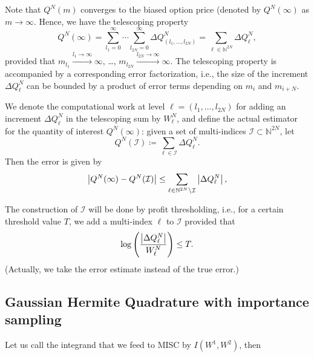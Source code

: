 \documentclass[11pt]{article}
\begin{document}
Note that $Q^N(m)$ converges to the biased option price (denoted by $Q^N(\infty)$ as
$m \to \infty$. Hence, we have the telescoping property
\begin{equation}
Q^N(\infty) = \sum_{l_1=0}^\infty \cdots \sum_{l_{2N} = 0}^\infty \Delta
Q^N_{(l_1, \ldots, l_{2N})} = \sum_{\ell \in \mathbb{N}^{2N}} \Delta Q^N_\ell,
\end{equation}
provided that $m_{l_1} \xrightarrow{l_1 \to \infty} \infty$, \ldots,
$m_{l_{2N}} \xrightarrow{l_{2N} \to \infty} \infty$. The telescoping property
is accompanied by a corresponding error factorization, i.e., the size of the
increment $\Delta Q^N_\ell$ can be bounded by a product of error terms depending
on $m_i$ and $m_{i+N}$.


We denote the computational work at level $\ell = (l_1, \ldots, l_{2N})$  for adding an increment $\Delta Q^N_{\ell}$
in the telescoping sum by  $W^N_\ell$, and   define the actual estimator for the quantity of interest
$Q^N(\infty)$: given a set of multi-indices $\mathcal{I} \subset
\mathbb{N}^{2N}$, let
\begin{equation*}
	Q^N(\mathcal{I}) \coloneqq \sum_{\ell \in \mathcal{I}} \Delta Q^N_\ell.
\end{equation*}
Then the error is given by
\begin{equation*}
	\left\lvert Q^N(\infty) - Q^N(\mathcal{I})\right\rvert \le \sum_{\ell \in \mathbb{N}^{2N} \setminus
		\mathcal{I}} \left\lvert\Delta Q^N_\ell\right\rvert,
\end{equation*}


The construction of $\mathcal{I}$ will be done by profit thresholding, i.e.,
for a certain threshold value $T$, we add a multi-index $\ell$ to
$\mathcal{I}$ provided that
\begin{equation*}
	\log\left( \frac{\left\lvert\Delta Q^N_\ell\right\rvert}{W^N_\ell} \right) \le T.
\end{equation*}
(Actually, we take the error estimate instead of the true error.)





\subsection{Gaussian Hermite Quadrature with importance sampling}\label{sec:Gaussian Hermite Quadrature with importance sampling}
Let us call the integrand that we feed to MISC by $I(W^1,W^2)$, then 
\end{document}
